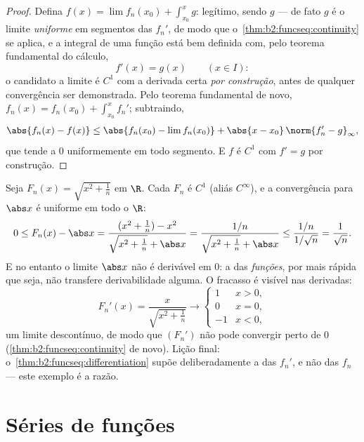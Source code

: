 \begin{proof}
Defina $f(x) = \lim f_n(x_0) + \int_{x_0}^x g$: legítimo, sendo $g$
 --- de fato $g$ é o limite \emph{uniforme} em
segmentos das  $f_n'$, de modo que
o~\cref{thm:b2:funcseq:continuity} se aplica, e a integral de
uma função  está bem definida com, pelo teorema
fundamental do cálculo,
\[
f'(x) = g(x) \qquad (x \in I) :
\]
o candidato a limite é $C^1$ com a derivada certa
\emph{por construção}, antes de qualquer convergência ser demonstrada. Pelo
teorema fundamental de novo, $f_n(x) = f_n(x_0) + \int_{x_0}^x
f_n'$; subtraindo,
\[
\abs{f_n(x) - f(x)} \leq \abs{f_n(x_0) - \lim f_n(x_0)}
+ \abs{x - x_0}\,\norm{f_n' - g}_{\infty} ,
\]
que tende a $0$ uniformemente em todo segmento. E $f$ é $C^1$
com $f' = g$ por construção.
\end{proof}

\begin{example}\label{ex:b2:funcseq:sqrtabs}
Seja $F_n(x) = \sqrt{x^2 + \frac1n}$ em $\R$. Cada $F_n$ é
$C^1$ (aliás $C^\infty$), e a convergência para $\abs x$ é
uniforme em todo o $\R$:
\[
0 \leq F_n(x) - \abs x
= \frac{(x^2 + \frac1n) - x^2}{\sqrt{x^2+\frac1n} + \abs x}
= \frac{1/n}{\sqrt{x^2 + \frac1n} + \abs x}
\leq \frac{1/n}{1/\sqrt n} = \frac{1}{\sqrt n} .
\]
E no entanto o limite $\abs x$ não é derivável em $0$: a  das \emph{funções}, por mais rápida que seja, não transfere
derivabilidade alguma. O fracasso é visível nas derivadas:
\[
F_n'(x) = \frac{x}{\sqrt{x^2 + \frac1n}}
\longrightarrow \begin{cases} 1 & x > 0,\\ 0 & x = 0,\\
-1 & x < 0, \end{cases}
\]
um limite  descontínuo, de modo que $(F_n')$ não pode convergir
 perto de $0$ (\cref{thm:b2:funcseq:continuity} de novo).
Lição final:
o~\cref{thm:b2:funcseq:differentiation} supõe deliberadamente
a  das $f_n'$, e não das $f_n$ ---
este exemplo é a razão.
\end{example}

\section{Séries de funções}

